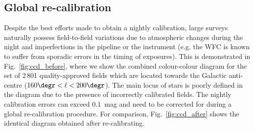 \documentclass[a4paper,useAMS,usenatbib]{mn2e}
\begin{document}
\subsection{Global re-calibration}

Despite the best efforts made to obtain a nightly calibration,
large surveys naturally possess field-to-field variations
due to atmospheric changes during the night
and imperfections in the pipeline or the instrument
(e.g. the WFC is known to suffer from sporadic errors
in the timing of exposures).
This is demonstrated in Fig.~\ref{fig:ccd_before},
where we show the combined colour-colour diagram
for the set of 2\,801 quality-approved fields
which are located towards the Galactic anti-centre
($160\degr < \ell < 200\degr$).
The main locus of stars is poorly defined
in the diagram due to the presence of
incorrectly calibrated fields.
The nightly calibration errors can exceed 0.1~mag
and need to be corrected for 
during a global re-calibration procedure.
For comparison, Fig.~\ref{fig:ccd_after}
shows the identical diagram
obtained after re-calibrating.
\end{document}
